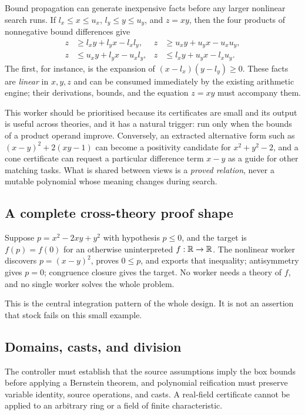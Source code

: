 Bound propagation can generate inexpensive facts before any larger nonlinear
search runs. If $l_x\le x\le u_x$, $l_y\le y\le u_y$, and $z=xy$, then the four
products of nonnegative bound differences give
\begin{align*}
 z&\ge l_xy+l_yx-l_xl_y, & z&\ge u_xy+u_yx-u_xu_y,\\
 z&\le u_xy+l_yx-u_xl_y, & z&\le l_xy+u_yx-l_xu_y.
\end{align*}
The first, for instance, is the expansion of $(x-l_x)(y-l_y)\ge0$. These facts
are \emph{linear} in $x,y,z$ and can be consumed immediately by the existing
arithmetic engine; their derivations, bounds, and the equation $z=xy$ must
accompany them.

This worker should be prioritised because its certificates are small and its
output is useful across theories, and it has a natural trigger: run only when
the bounds of a product operand improve. Conversely, an extracted alternative
form such as $(x-y)^2+2(xy-1)$ can become a positivity candidate for
$x^2+y^2-2$, and a cone certificate can request a particular difference term
$x-y$ as a guide for other matching tasks. What is shared between views is a
\emph{proved relation}, never a mutable polynomial whose meaning changes during
search.

\subsection{A complete cross-theory proof shape}

Suppose $p=x^2-2xy+y^2$ with hypothesis $p\le0$, and the target is $f(p)=f(0)$
for an otherwise uninterpreted $f:\mathbb{R}\to\mathbb{R}$. The nonlinear worker discovers
$p=(x-y)^2$, proves $0\le p$, and exports that inequality; antisymmetry gives
$p=0$; congruence closure gives the target. No worker needs a theory of $f$, and
no single worker solves the whole problem.

This is the central integration pattern of the whole design. It is not an
assertion that stock \grind{} fails on this small example.

\subsection{Domains, casts, and division}

The controller must establish that the source assumptions imply the box bounds
before applying a Bernstein theorem, and polynomial reification must preserve
variable identity, source operations, and casts. A real-field certificate cannot
be applied to an arbitrary ring or a field of finite characteristic.

